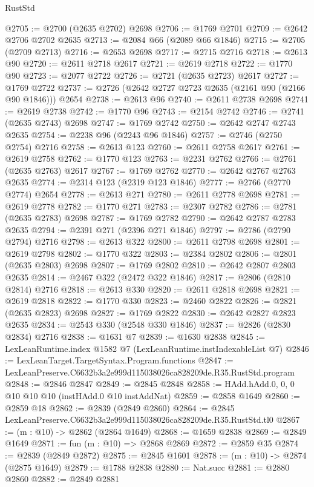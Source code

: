 \begin{lexlean}{RustStd}
\begin{coremodule}
@2705 := @2700 (@2635 @2702) @2698
@2706 := @1769 @2701
@2709 := @2642 @2706 @2702 @2635
@2713 := @2084 @66 (@2089 @66 @1846)
@2715 := @2705 (@2709 @2713)
@2716 := @2653 @2698
@2717 := @2715 @2716
@2718 := @2613 @90
@2720 := @2611 @2718 @2617
@2721 := @2619 @2718
@2722 := @1770 @90
@2723 := @2077 @2722
@2726 := @2721 (@2635 @2723) @2617
@2727 := @1769 @2722
@2737 := @2726 (@2642 @2727 @2723 @2635 (@2161 @90 (@2166 @90 @1846))) @2654
@2738 := @2613 @96
@2740 := @2611 @2738 @2698
@2741 := @2619 @2738
@2742 := @1770 @96
@2743 := @2154 @2742
@2746 := @2741 (@2635 @2743) @2698
@2747 := @1769 @2742
@2750 := @2642 @2747 @2743 @2635
@2754 := @2238 @96 (@2243 @96 @1846)
@2757 := @2746 (@2750 @2754) @2716
@2758 := @2613 @123
@2760 := @2611 @2758 @2617
@2761 := @2619 @2758
@2762 := @1770 @123
@2763 := @2231 @2762
@2766 := @2761 (@2635 @2763) @2617
@2767 := @1769 @2762
@2770 := @2642 @2767 @2763 @2635
@2774 := @2314 @123 (@2319 @123 @1846)
@2777 := @2766 (@2770 @2774) @2654
@2778 := @2613 @271
@2780 := @2611 @2778 @2698
@2781 := @2619 @2778
@2782 := @1770 @271
@2783 := @2307 @2782
@2786 := @2781 (@2635 @2783) @2698
@2787 := @1769 @2782
@2790 := @2642 @2787 @2783 @2635
@2794 := @2391 @271 (@2396 @271 @1846)
@2797 := @2786 (@2790 @2794) @2716
@2798 := @2613 @322
@2800 := @2611 @2798 @2698
@2801 := @2619 @2798
@2802 := @1770 @322
@2803 := @2384 @2802
@2806 := @2801 (@2635 @2803) @2698
@2807 := @1769 @2802
@2810 := @2642 @2807 @2803 @2635
@2814 := @2467 @322 (@2472 @322 @1846)
@2817 := @2806 (@2810 @2814) @2716
@2818 := @2613 @330
@2820 := @2611 @2818 @2698
@2821 := @2619 @2818
@2822 := @1770 @330
@2823 := @2460 @2822
@2826 := @2821 (@2635 @2823) @2698
@2827 := @1769 @2822
@2830 := @2642 @2827 @2823 @2635
@2834 := @2543 @330 (@2548 @330 @1846)
@2837 := @2826 (@2830 @2834) @2716
@2838 := @1631 @7
@2839 := @1630 @2838
@2845 := LexLeanRuntime.index @1582 @7 (LexLeanRuntime.instIndexableList @7)
@2846 := LexLeanTarget.TargetSyntax.Program.functions
@2847 := LexLeanPreserve.C6632b3a2e999d115038026ca828209de.R35.RustStd.program
@2848 := @2846 @2847
@2849 := @2845 @2848
@2858 := HAdd.hAdd.{0, 0, 0} @10 @10 @10 (instHAdd.{0} @10 instAddNat)
@2859 := @2858 @1649
@2860 := @2859 @18
@2862 := @2839 (@2849 @2860)
@2864 := @2845 LexLeanPreserve.C6632b3a2e999d115038026ca828209de.R35.RustStd.tl0
@2867 := (m : @10) -> @2862 (@2864 @1649)
@2868 := @1659 @2838
@2869 := @2849 @1649
@2871 := fun (m : @10) => @2868 @2869
@2872 := @2859 @35
@2874 := @2839 (@2849 @2872)
@2875 := @2845 @1601
@2878 := (m : @10) -> @2874 (@2875 @1649)
@2879 := @1788 @2838
@2880 := Nat.succ
@2881 := @2880 @2860
@2882 := @2849 @2881

\end{coremodule}
\end{lexlean}
